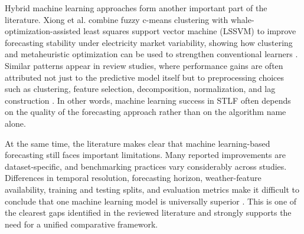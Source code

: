 \documentclass[conference]{IEEEtran}
\begin{document}
Hybrid machine learning approaches form another important part of the literature. Xiong et al. combine fuzzy c-means clustering with whale-optimization-assisted least squares support vector machine (LSSVM) to improve forecasting stability under electricity market variability, showing how clustering and metaheuristic optimization can be used to strengthen conventional learners \cite{10062299}. Similar patterns appear in review studies, where performance gains are often attributed not just to the predictive model itself but to preprocessing choices such as clustering, feature selection, decomposition, normalization, and lag construction \cite{vivas2020,azeem2021,khalil2022}. In other words, machine learning success in STLF often depends on the quality of the forecasting approach rather than on the algorithm name alone.

At the same time, the literature makes clear that machine learning-based forecasting still faces important limitations. Many reported improvements are dataset-specific, and benchmarking practices vary considerably across studies. Differences in temporal resolution, forecasting horizon, weather-feature availability, training and testing splits, and evaluation metrics make it difficult to conclude that one machine learning model is universally superior \cite{vivas2020,khalil2022,zhang2021}. This is one of the clearest gaps identified in the reviewed literature and strongly supports the need for a unified comparative framework.
\end{document}
